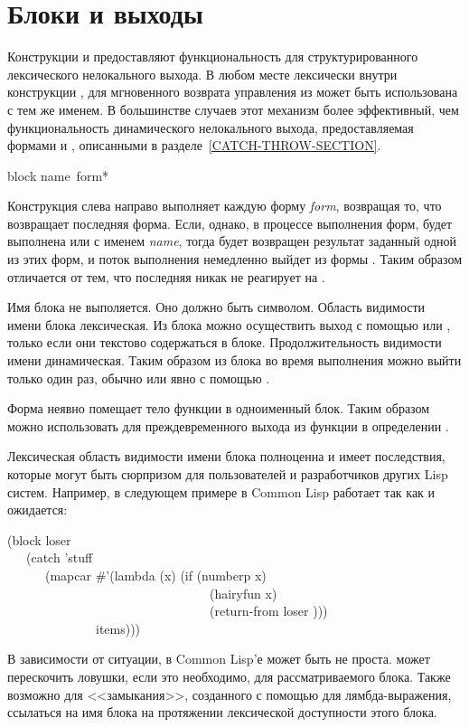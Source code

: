 \section{Блоки и выходы}
\label{BLOCK-RETURN-SECTION}

Конструкции  и  предоставляют функциональность для
структурированного лексического нелокального выхода. В любом месте лексически
внутри конструкции , для мгновенного возврата управления из
 может быть использована  с тем же именем.
В большинстве случаев этот механизм более эффективный, чем функциональность
динамического нелокального выхода, предоставляемая формами  и
, описанными в разделе~\ref{CATCH-THROW-SECTION}.

\begin{defspec}
block name {\,form}*

Конструкция  слева направо выполняет каждую форму \emph{form},
возвращая то, что возвращает последняя форма.
Если, однако, в процессе выполнения форм, будет выполнена  или
 с именем \emph{name}, тогда будет возвращен результат заданный
одной из этих форм, и поток выполнения немедленно выйдет из формы .
Таким образом  отличается от  тем, что последняя никак не
реагирует на .

Имя блока не выполяется. Оно должно быть символом.
Область видимости имени блока лексическая. Из блока можно осуществить выход с
помощью  или , только если они текстово содержаться
в блоке. Продолжительность видимости имени динамическая.
Таким образом из блока во время выполнения можно выйти только один раз, обычно
или явно с помощью .

Форма  неявно помещает тело функции в одноименный блок. 
Таким образом можно использовать  для преждевременного выхода
из функции в определении .

Лексическая область видимости имени блока полноценна и имеет последствия,
которые могут быть сюрпризом для пользователей и разработчиков других Lisp
систем.
Например,  в следующем примере в Common Lisp работает так как
и ожидается:
\begin{lisp}
(block loser \\
~~~(catch 'stuff \\
~~~~~~(mapcar \#'(lambda (x) (if (numberp x) \\
~~~~~~~~~~~~~~~~~~~~~~~~~~~~~~~~(hairyfun x) \\
~~~~~~~~~~~~~~~~~~~~~~~~~~~~~~~~(return-from loser {\nil}))) \\
~~~~~~~~~~~~~~items)))
\end{lisp}
В зависимости от ситуации,  в Common Lisp'е может быть не проста.
 может перескочить ловушки, если это необходимо, для
рассматриваемого блока.
Также возможно для <<замыкания>>, созданного с помощью  для
лямбда-выражения, ссылаться на имя блока на протяжении лексической доступности
этого блока.
\end{defspec}

